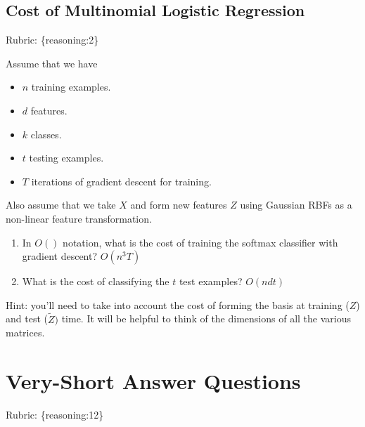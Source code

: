 \documentclass{article}
\def\rubric#1{\gre{Rubric: \{#1\}}}{}
\def\blu#1{{\color{blu}#1}}
\def\gre#1{{\color{gre}#1}}
\def\red#1{{\color{red}#1}}
\def\items#1{\begin{itemize}#1\end{itemize}}
\def\enum#1{\begin{enumerate}#1\end{enumerate}}
\begin{document}
\subsection{Cost of Multinomial Logistic Regression}
\rubric{reasoning:2}

Assume that we have
\items{
\item $n$ training examples.
\item $d$ features.
\item $k$ classes.
\item $t$ testing examples.
\item $T$ iterations of gradient descent for training.
}
Also assume that we take $X$ and form new features $Z$ using Gaussian RBFs as a non-linear feature transformation.
\blu{\enum{
\item In $O()$ notation, what is the cost of training the softmax classifier with gradient descent? \red{$O(n^{3}T)$}
\item What is the cost of classifying the $t$ test examples? \red{$O(ndt)$}
}
}
Hint: you'll need to take into account the cost of forming the basis at training ($Z$) and test ($\tilde{Z})$ time. It will be helpful to think of the dimensions of all the various matrices.



\section{Very-Short Answer Questions}
\rubric{reasoning:12}
\end{document}
